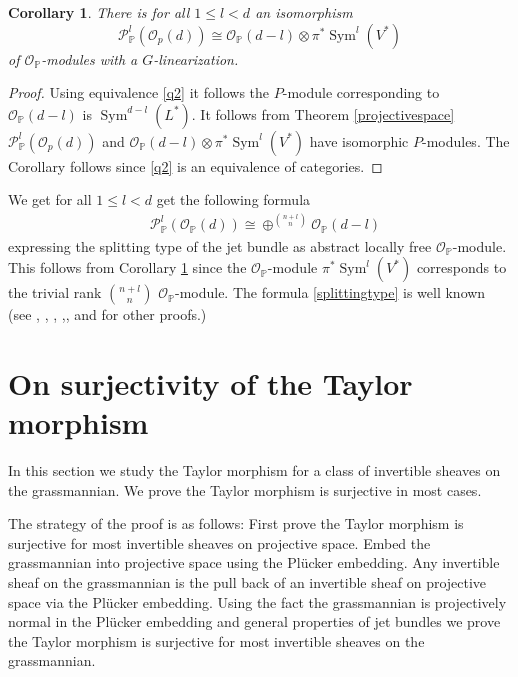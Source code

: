 \documentclass{amsart}
\theoremstyle{plain}
\newtheorem{corollary}[theorem]{Corollary}
\theoremstyle{definition}
\theoremstyle{remark}
\numberwithin{equation}{theorem}
\begin{document}
\begin{corollary} \label{split} There is for all $1\leq l < d$ an isomorphism
\[ {\mathcal{P} }^l_{\mathbb{P}}({\mathcal{O} }_p(d))\cong {\mathcal{O} }_{\mathbb{P}}(d-l)\otimes \pi^*{\operatorname{Sym} }^l(V^*) \]
of ${\mathcal{O} }_{\mathbb{P}}$-modules with a $G$-linearization.
\end{corollary}
\begin{proof} Using equivalence \ref{q2} it follows the $P$-module
  corresponding
to ${\mathcal{O} }_{\mathbb{P}}(d-l)$ is ${\operatorname{Sym} }^{d-l}(L^*)$. It follows from Theorem \ref{projectivespace}
${\mathcal{P} }^l_{\mathbb{P}}({\mathcal{O} }_p(d))$ and ${\mathcal{O} }_{\mathbb{P}}(d-l)\otimes \pi^*{\operatorname{Sym} }^l(V^*)$
have isomorphic $P$-modules. The Corollary follows since \ref{q2} is
an equivalence of categories.
\end{proof}
We get for all $1\leq l <d$ get the following formula
\begin{align}
&\label{splittingtype} {\mathcal{P} }^l_{\mathbb{P}}({\mathcal{O} }_{\mathbb{P}}(d))\cong \oplus^{\binom{n+l}{n}}{\mathcal{O} }_{\mathbb{P}}(d-l)
\end{align}
expressing the splitting type of the jet bundle as abstract locally
free ${\mathcal{O} }_{\mathbb{P}}$-module. This follows from Corollary \ref{split} since the ${\mathcal{O} }_{\mathbb{P}}$-module $\pi^*{\operatorname{Sym} }^l(V^*)$
corresponds to the trivial rank $\binom{n+l}{n}$ ${\mathcal{O} }_{\mathbb{P}}$-module.
The formula \ref{splittingtype} is well known (see \cite{maa1}, \cite{maa2}, \cite{maa4},
\cite{perk},\cite{pien}, \cite{diro} and \cite{somm} for other proofs.)

\section{On surjectivity of the Taylor morphism}

In this section we study the Taylor morphism for a class of invertible
sheaves on the grassmannian. We prove the Taylor morphism is
surjective in most cases. 
 
The strategy of the proof is as follows: First prove the Taylor morphism is
surjective for most invertible sheaves on projective space. 
Embed the grassmannian into projective space using the Pl\"{u}cker embedding.
Any invertible sheaf on the grassmannian is the pull back of an
invertible sheaf on projective space via the Pl\"{u}cker embedding.
Using the fact the grassmannian is projectively normal in the Pl\"{u}cker embedding
and general properties of jet bundles we prove the Taylor morphism is
surjective for most invertible sheaves on the grassmannian.
\end{document}
